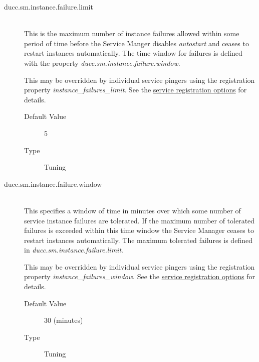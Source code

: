 \begin{description}
      \item[ducc.sm.instance.failure.limit] \hfill \\
        This is the maximum number of instance failures allowed within some period of
        time before the Service Manger disables {\em autostart} and ceases to restart
        instances automatically.  The time window for failures is defined with the
        property {\em ducc.sm.instance.failure.window}.

        This may be overridden by individual service pingers using the registration
        property {\em instance\_failures\_limit}. See the
        \hyperref[subsec:cli.ducc-services.register]{service registration options}
        for details.

        \begin{description}
          \item[Default Value] 5
          \item[Type] Tuning 
        \end{description}

      \item[ducc.sm.instance.failure.window] \hfill \\
        This specifies a window of time in minutes over which some number of service instance
        failures are tolerated.  If the maximum number of tolerated failures is
        exceeded within this time window the Service Manager ceases to restart
        instances automatically.  The maximum tolerated failures is defined in
        {\em ducc.sm.instance.failure.limit}.

        This may be overridden by individual service pingers using the registration
        property {\em instance\_failures\_window}. See the
        \hyperref[subsec:cli.ducc-services.register]{service registration options}
        for details.

        \begin{description}
          \item[Default Value] 30 (minutes)
          \item[Type] Tuning 
        \end{description}
       
      \end{description}
      

